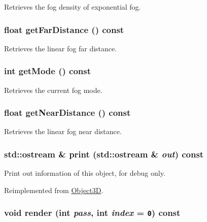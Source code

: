 Retrieves the fog density of exponential fog. \hypertarget{classm3g_1_1Fog_90df17252a921929fce6a5e92aed4021}{
\subsubsection[{getFarDistance}]{\setlength{\rightskip}{0pt plus 5cm}float getFarDistance () const}}
\label{classm3g_1_1Fog_90df17252a921929fce6a5e92aed4021}


Retrieves the linear fog far distance. \hypertarget{classm3g_1_1Fog_d4ce4524e4751fe5e3cfb8c270347d54}{
\subsubsection[{getMode}]{\setlength{\rightskip}{0pt plus 5cm}int getMode () const}}
\label{classm3g_1_1Fog_d4ce4524e4751fe5e3cfb8c270347d54}


Retrieves the current fog mode. \hypertarget{classm3g_1_1Fog_cd7a642e43bf99b0e1c5c24d3c6424a2}{
\subsubsection[{getNearDistance}]{\setlength{\rightskip}{0pt plus 5cm}float getNearDistance () const}}
\label{classm3g_1_1Fog_cd7a642e43bf99b0e1c5c24d3c6424a2}


Retrieves the linear fog near distance. \hypertarget{classm3g_1_1Fog_6fea17fa1532df3794f8cb39cb4f911f}{
\subsubsection[{print}]{\setlength{\rightskip}{0pt plus 5cm}std::ostream \& print (std::ostream \& {\em out}) const}}
\label{classm3g_1_1Fog_6fea17fa1532df3794f8cb39cb4f911f}


Print out information of this object, for debug only. 

Reimplemented from \hyperlink{classm3g_1_1Object3D_6fea17fa1532df3794f8cb39cb4f911f}{Object3D}.\hypertarget{classm3g_1_1Fog_1efcb1973989d9963d5bd6d03065d389}{
\subsubsection[{render}]{\setlength{\rightskip}{0pt plus 5cm}void render (int {\em pass}, \/  int {\em index} = {\tt 0}) const}}
\label{classm3g_1_1Fog_1efcb1973989d9963d5bd6d03065d389}


